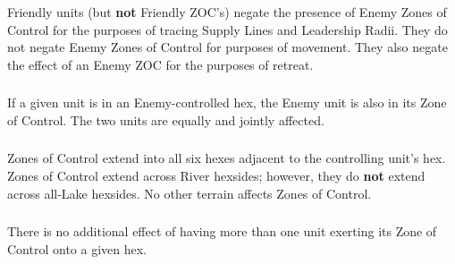 \subsubsection{} Friendly units (but \textbf{not} Friendly ZOC's) negate the presence of Enemy Zones of Control for the purposes of tracing Supply Lines and Leadership Radii. They do not negate Enemy Zones of Control for purposes of movement. They also negate the effect of an Enemy ZOC for the purposes of retreat.

\subsubsection{} If a given unit is in an Enemy-controlled hex, the Enemy unit is also in its Zone of Control. The two units are equally and jointly affected.

\subsubsection{} Zones of Control extend into all six hexes adjacent to the controlling unit's hex. Zones of Control extend across River hexsides; however, they do \textbf{not} extend across all-Lake hexsides. No other terrain affects Zones of Control.

\subsubsection{} There is no additional effect of having more than one unit exerting its Zone of Control onto a given hex.
